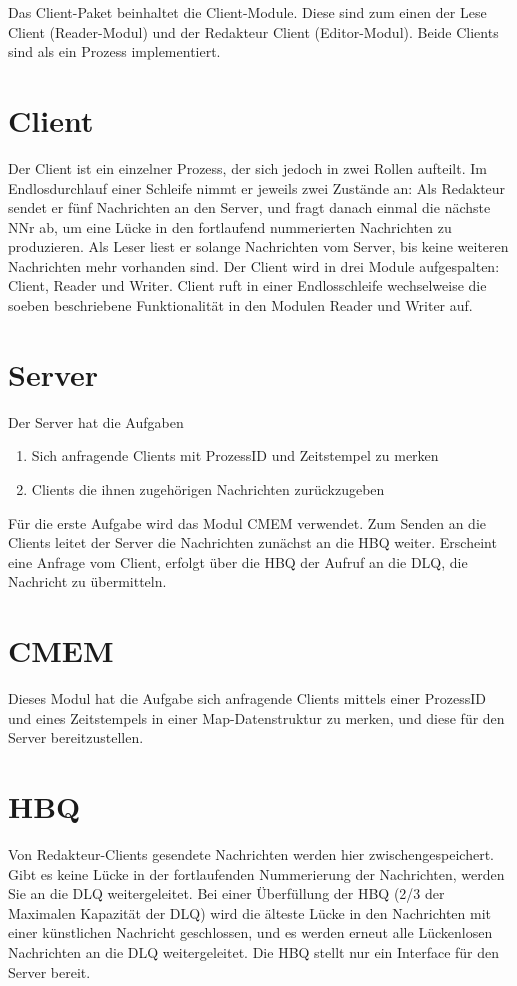 \documentclass{scrreprt}
\begin{document}
Das Client-Paket beinhaltet die Client-Module. Diese sind zum einen der Lese Client (Reader-Modul) und der Redakteur
Client (Editor-Modul). Beide Clients sind als ein Prozess implementiert.

\section{Client}
Der Client ist ein einzelner Prozess, der sich jedoch in zwei Rollen aufteilt. Im Endlosdurchlauf einer Schleife nimmt er jeweils zwei Zustände an: 
    Als Redakteur sendet er fünf Nachrichten an den Server, und fragt danach einmal die nächste NNr ab, um eine Lücke in den fortlaufend nummerierten Nachrichten zu produzieren.
    Als Leser liest er solange Nachrichten vom Server, bis keine weiteren Nachrichten mehr vorhanden sind.
    \newline
Der Client wird in drei Module aufgespalten: Client, Reader und Writer. Client ruft in einer Endlosschleife wechselweise die soeben beschriebene Funktionalität in den Modulen Reader und Writer auf.

\section{Server}
Der Server hat die Aufgaben  
\begin{enumerate}
    \item{Sich anfragende Clients mit ProzessID und Zeitstempel zu merken}
    \item{Clients die ihnen zugehörigen Nachrichten zurückzugeben}
\end{enumerate}
Für die erste Aufgabe wird das Modul CMEM verwendet. Zum Senden an die Clients leitet der Server die Nachrichten zunächst an die HBQ weiter. Erscheint eine Anfrage vom Client, erfolgt über die HBQ der Aufruf an die DLQ, die Nachricht zu übermitteln.

\section{CMEM}
Dieses Modul hat die Aufgabe sich anfragende Clients mittels einer ProzessID und eines Zeitstempels in einer Map-Datenstruktur zu merken, und diese für den Server bereitzustellen.

\section{HBQ}
Von Redakteur-Clients gesendete Nachrichten werden hier zwischengespeichert. Gibt es keine Lücke in der fortlaufenden Nummerierung der Nachrichten, werden Sie an die DLQ weitergeleitet. Bei einer Überfüllung der HBQ (2/3 der Maximalen Kapazität der DLQ) wird die älteste Lücke in den Nachrichten mit einer künstlichen Nachricht geschlossen, und es werden erneut alle Lückenlosen Nachrichten an die DLQ weitergeleitet. Die HBQ stellt nur ein Interface für den Server bereit.
\end{document}
